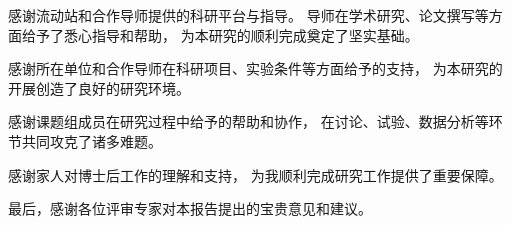 \begin{thanks}

感谢流动站和合作导师提供的科研平台与指导。
导师在学术研究、论文撰写等方面给予了悉心指导和帮助，
为本研究的顺利完成奠定了坚实基础。

感谢所在单位和合作导师在科研项目、实验条件等方面给予的支持，
为本研究的开展创造了良好的研究环境。

感谢课题组成员在研究过程中给予的帮助和协作，
在讨论、试验、数据分析等环节共同攻克了诸多难题。

感谢家人对博士后工作的理解和支持，
为我顺利完成研究工作提供了重要保障。

最后，感谢各位评审专家对本报告提出的宝贵意见和建议。

\end{thanks}